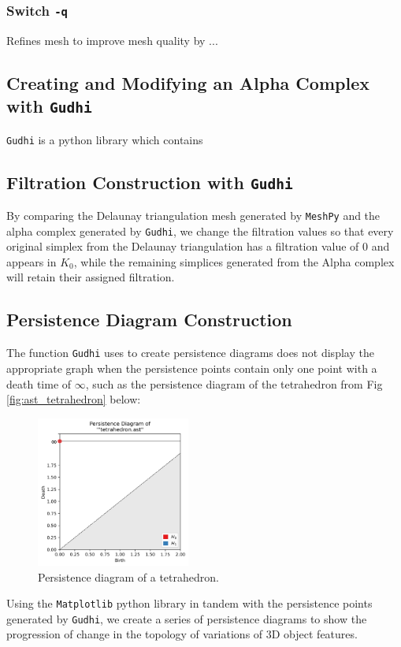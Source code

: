 \documentclass[ma]{uncgdissertationexp}
\theoremstyle{plain}
\theoremstyle{definition}
\theoremstyle{remark}
\begin{document}
\cprotect\subsubsection{Switch \verb+-q+}
Refines mesh to improve mesh quality by ...

\cprotect\subsection{Creating and Modifying an Alpha Complex with \verb+Gudhi+}
\par \verb"Gudhi" is a python library which contains 


\cprotect\subsection{Filtration Construction with \verb+Gudhi+}
\par By comparing the Delaunay triangulation mesh generated by \verb"MeshPy" and the alpha complex generated by \verb"Gudhi", we change the filtration values so that every original simplex from the Delaunay triangulation has a filtration value of 0 and appears in $K_{0}$, while the remaining simplices generated from the Alpha complex will retain their assigned filtration.

\subsection{Persistence Diagram Construction}
\par The function \verb"Gudhi" uses to create persistence diagrams does not display the appropriate graph when the persistence points contain only one point with a death time of $\infty$, such as the persistence diagram of the tetrahedron from Fig \ref{fig:ast_tetrahedron} below:
\begin{figure}[H]
    \begin{center}
	    \includegraphics[width=0.45\textwidth]{tetrahedron persdia.png}
    	\caption{Persistence diagram of a tetrahedron.}
    \end{center}
\end{figure}
\par Using the \verb"Matplotlib" python library in tandem with the persistence points generated by \verb"Gudhi", we create a series of persistence diagrams to show the progression of change in the topology of variations of 3D object features.
\end{document}
